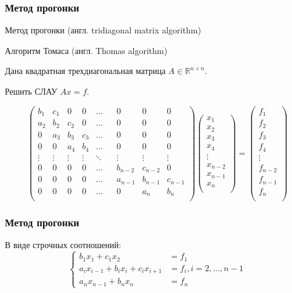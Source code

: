 \documentclass[10pt]{beamer}
\begin{document}
\begin{frame}[fragile]
\frametitle{Метод прогонки}

Метод прогонки (англ. tridiagonal matrix algorithm) 

Алгоритм Томаса (англ. Thomas algorithm)

Дана квадратная трехдиагональная матрица $A \in \mathbb{R}^{n \times n}$. 

Решить СЛАУ $A x = f$.

$$
\begin{pmatrix}
b_1&c_1& 0 & 0 &\hdots&  & 0 & 0 & 0\\
a_2&b_2&c_2& 0 &\hdots&  & 0 & 0 & 0\\
0 &a_3&b_3&c_3&\hdots&  & 0 & 0 & 0\\
0 & 0 &a_4&b_4&\hdots&  & 0 & 0 & 0\\
\vdots&\vdots&\vdots&\vdots&\ddots&  &\vdots&\vdots&\vdots\\
0 & 0 & 0 & 0 &\hdots&  &b_{n-2}&c_{n-2}& 0\\
0 & 0 & 0 & 0 &\hdots&  &a_{n-1}&b_{n-1}&c_{n-1}\\
0 & 0 & 0 & 0 &\hdots&  & 0 &a_{n}&b_{n}\\
\end{pmatrix}
\begin{pmatrix}
x_1\\
x_2\\
x_3\\
x_4\\
\vdots\\
x_{n-2}\\
x_{n-1}\\
x_n\\
\end{pmatrix}
=
\begin{pmatrix}
f_1\\
f_2\\
f_3\\
f_4\\
\vdots\\
f_{n-2}\\
f_{n-1}\\
f_n\\
\end{pmatrix}
$$
\end{frame}


\begin{frame}[fragile]
\frametitle{Метод прогонки}

В виде строчных соотношений:
$$
\begin{cases}
b_1 x_1 + c_1 x_{2}                 &= f_1\\
a_i x_{i-1} + b_i x_i + c_i x_{i+1} &= f_i, i = 2,..., n-1\\
a_n x_{n-1} + b_n x_n               &= f_n
\end{cases}
$$
\end{frame}
\end{document}
